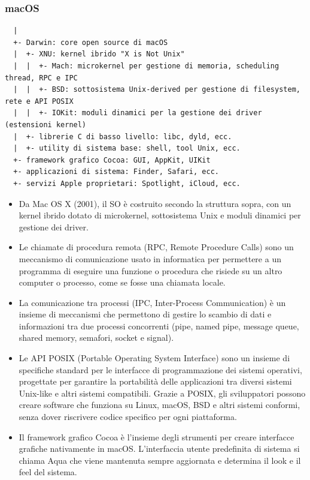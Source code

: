 \documentclass[a4paper]{article}
\begin{document}
\subsubsection*{macOS}
\vspace{-5pt}
\begin{verbatim}
  |
  +- Darwin: core open source di macOS
  |  +- XNU: kernel ibrido "X is Not Unix"
  |  |  +- Mach: microkernel per gestione di memoria, scheduling thread, RPC e IPC
  |  |  +- BSD: sottosistema Unix-derived per gestione di filesystem, rete e API POSIX
  |  |  +- IOKit: moduli dinamici per la gestione dei driver (estensioni kernel)
  |  +- librerie C di basso livello: libc, dyld, ecc.
  |  +- utility di sistema base: shell, tool Unix, ecc.
  +- framework grafico Cocoa: GUI, AppKit, UIKit
  +- applicazioni di sistema: Finder, Safari, ecc.
  +- servizi Apple proprietari: Spotlight, iCloud, ecc.
\end{verbatim}

\begin{itemize}
	\item Da Mac OS X (2001), il SO è costruito secondo la struttura sopra, con un kernel ibrido dotato di microkernel,
	sottosistema Unix e moduli dinamici per gestione dei driver.
	\item Le chiamate di procedura remota (RPC, Remote Procedure Calls) sono un meccanismo di comunicazione usato in informatica
	per permettere a un programma di eseguire una funzione o procedura che risiede su un altro computer o processo, come se fosse
	una chiamata locale.
	\item La comunicazione tra processi (IPC, Inter-Process Communication) è un insieme di meccanismi che permettono di gestire
	lo scambio di dati e informazioni tra due processi concorrenti (pipe, named pipe, message queue, shared memory, semafori,
	socket e signal).
	\item Le API POSIX (Portable Operating System Interface) sono un insieme di specifiche standard per le interfacce di
	programmazione dei sistemi operativi, progettate per garantire la portabilità delle applicazioni tra diversi sistemi
	Unix-like e altri sistemi compatibili. Grazie a POSIX, gli sviluppatori possono creare software che funziona su Linux,
	macOS, BSD e altri sistemi conformi, senza dover riscrivere codice specifico per ogni piattaforma.
	\item Il framework grafico Cocoa è l'insieme degli strumenti per creare interfacce grafiche nativamente in macOS. L'interfaccia
	utente predefinita di sistema si chiama Aqua che viene mantenuta sempre aggiornata e determina il look e il feel del sistema.
\end{itemize}
\end{document}
